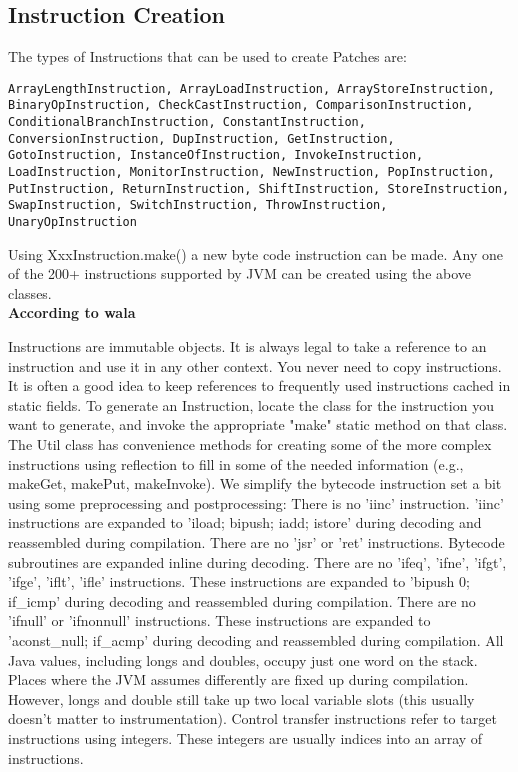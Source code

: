 \documentclass[11pt,psfig,a4]{article}
\begin{document}
\begin{flushleft}
\subsection{Instruction Creation}
The types of Instructions that can be used to create Patches are:\\
\begin{lstlisting}
ArrayLengthInstruction, ArrayLoadInstruction, ArrayStoreInstruction, BinaryOpInstruction, CheckCastInstruction, ComparisonInstruction, ConditionalBranchInstruction, ConstantInstruction, ConversionInstruction, DupInstruction, GetInstruction, GotoInstruction, InstanceOfInstruction, InvokeInstruction, LoadInstruction, MonitorInstruction, NewInstruction, PopInstruction, PutInstruction, ReturnInstruction, ShiftInstruction, StoreInstruction, SwapInstruction, SwitchInstruction, ThrowInstruction, UnaryOpInstruction
\end{lstlisting}
Using XxxInstruction.make() a new byte code instruction can be made. Any one of the 200+ instructions supported by JVM can be created using the above classes.\\
\vspace{0.5em}
\textbf{According to wala}\\
\begin{adjustwidth}{2.3em}{}
Instructions are immutable objects. It is always legal to take a reference to an instruction and use it in any other context. You never need to copy instructions. It is often a good idea to keep references to frequently used instructions cached in static fields. To generate an Instruction, locate the class for the instruction you want to generate, and invoke the appropriate "make" static method on that class. The Util class has convenience methods for creating some of the more complex instructions using reflection to fill in some of the needed information (e.g., makeGet, makePut, makeInvoke). We simplify the bytecode instruction set a bit using some preprocessing and postprocessing: There is no 'iinc' instruction. 'iinc' instructions are expanded to 'iload; bipush; iadd; istore' during decoding and reassembled during compilation. There are no 'jsr' or 'ret' instructions. Bytecode subroutines are expanded inline during decoding. There are no 'ifeq', 'ifne', 'ifgt', 'ifge', 'iflt', 'ifle' instructions. These instructions are expanded to 'bipush 0; if\_icmp' during decoding and reassembled during compilation. There are no 'ifnull' or 'ifnonnull' instructions. These instructions are expanded to 'aconst\_null; if\_acmp' during decoding and reassembled during compilation. All Java values, including longs and doubles, occupy just one word on the stack. Places where the JVM assumes differently are fixed up during compilation. However, longs and double still take up two local variable slots (this usually doesn't matter to instrumentation). Control transfer instructions refer to target instructions using integers. These integers are usually indices into an array of instructions.\\
\end{adjustwidth}
\end{flushleft}
\end{document}
